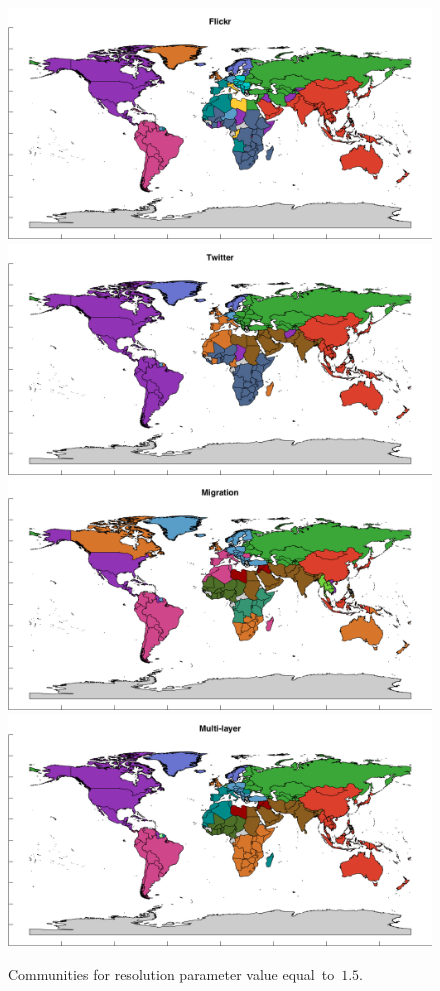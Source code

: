 \documentclass[aps,superscriptaddress,showkeys,nofootinbib]{revtex4-1}
\begin{document}
\begin{figure}[b!]
\centering
\includegraphics[width=.49\textwidth]{partitioning_Flickr_a=15.png}
\includegraphics[width=.49\textwidth]{partitioning_Twitter_a=15.png}
\includegraphics[width=.49\textwidth]{partitioning_Migration_a=15.png}
\includegraphics[width=.49\textwidth]{partitioning_Multi-layer_a=15.png}
\caption{\label{fig::partitioning15}Communities for resolution parameter value equal~to~$1.5$.}
\end{figure}
\end{document}
